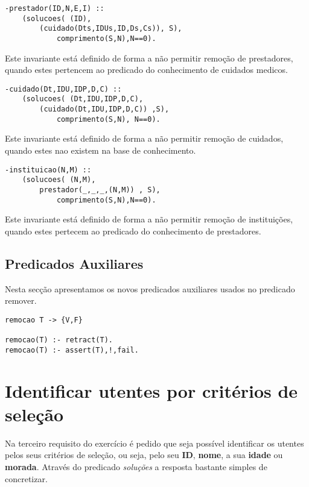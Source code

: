 \documentclass{report}
\def\titulo#1{\section{#1}}
\begin{document}
\begin{verbatim}
-prestador(ID,N,E,I) :: 
    (solucoes( (ID), 
        (cuidado(Dts,IDUs,ID,Ds,Cs)), S),
            comprimento(S,N),N==0).
\end{verbatim}
Este invariante está definido de forma a não permitir remoção de prestadores, quando estes pertencem ao predicado do conhecimento de cuidados medicos.
\bigbreak

\begin{verbatim}
-cuidado(Dt,IDU,IDP,D,C) :: 
    (solucoes( (Dt,IDU,IDP,D,C), 
        (cuidado(Dt,IDU,IDP,D,C)) ,S),
            comprimento(S,N), N==0).
\end{verbatim}
Este invariante está definido de forma a não permitir remoção de cuidados, quando estes nao existem na base de conhecimento.
\bigbreak

\begin{verbatim}
-instituicao(N,M) :: 
    (solucoes( (N,M), 
        prestador(_,_,_,(N,M)) , S), 
            comprimento(S,N),N==0).
\end{verbatim} 
Este invariante está definido de forma a não permitir remoção de instituições, quando estes pertecem ao predicado do conhecimento de prestadores.
\bigbreak

 
\subsection{Predicados Auxiliares}

Nesta secção apresentamos os novos predicados auxiliares usados no predicado remover.

\begin{verbatim}
remocao T -> {V,F}

remocao(T) :- retract(T).
remocao(T) :- assert(T),!,fail.
\end{verbatim}



























\titulo{Identificar utentes por critérios de seleção}

Na terceiro requisito do exercício é pedido que seja possível identificar os utentes pelos seus critérios de seleção, ou seja, pelo seu \textbf{ID}, \textbf{nome}, a sua \textbf{idade} ou \textbf{morada}. Através do predicado \textit{soluções} a resposta bastante simples de concretizar.
\end{document}
